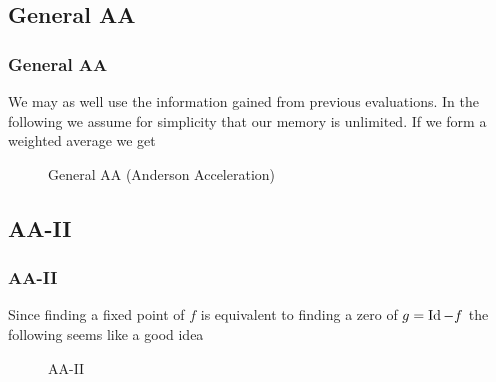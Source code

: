 \subsection{General AA}
\begin{frame}
	\frametitle{General AA}
	We may as well use the information gained from previous evaluations. In the following we assume for simplicity that our memory is unlimited. If we form a weighted average we get
	
	\begin{figure}
	\begin{algorithm}[H]
	\caption{General AA (Anderson Acceleration)}
	\color{gray}
	
	\BlankLine
	\end{algorithm}
	\end{figure}
\end{frame}

\subsection{AA-II}
\begin{frame}
	\frametitle{AA-II}
	Since finding a fixed point of $f$ is equivalent to finding a zero of $g=\operatorname{Id}-f$ the following seems like a good idea
	
	\begin{figure}
	\begin{algorithm}[H]
	\caption{AA-II}
	\color{gray}
	\BlankLine
	\end{algorithm}
	\end{figure}
\end{frame}

